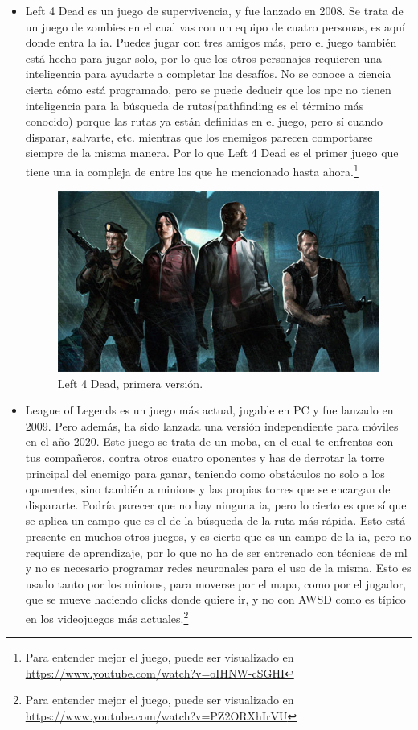 \begin{itemize}
	\item Left 4 Dead es un juego de supervivencia, y fue lanzado en 2008. Se trata de un juego de zombies en el cual vas con un equipo de cuatro personas, es aquí donde entra la \gls{ia}. Puedes jugar con tres amigos más, pero el juego también está hecho para jugar solo, por lo que los otros personajes requieren una inteligencia para ayudarte a completar los desafíos. No se conoce a ciencia cierta cómo está programado, pero se puede deducir que los \gls{npc} no tienen inteligencia para la búsqueda de rutas(pathfinding es el término más conocido) porque las rutas ya están definidas en el juego, pero sí cuando disparar, salvarte, etc.  mientras que los enemigos parecen comportarse siempre de la misma manera. Por lo que Left 4 Dead es el primer juego que tiene una \gls{ia} compleja de entre los que he mencionado hasta ahora.\footnote{Para entender mejor el juego, puede ser visualizado en \url{https://www.youtube.com/watch?v=oIHNW-cSGHI}}
	\begin{figure}[h]
		\centering
		\includegraphics[width=15cm]{archivos/imagenes/Left-4-Dead.jpg}
		\caption{Left 4 Dead, primera versión.}
	\end{figure}
	\item League of Legends es un juego más actual, jugable en PC y fue lanzado en 2009. Pero además, ha sido lanzada una versión independiente para móviles en el año 2020. Este juego se trata de un \gls{moba}, en el cual te enfrentas con tus compañeros, contra otros cuatro oponentes y has de derrotar la torre principal del enemigo para ganar, teniendo como obstáculos no solo a los oponentes, sino también a minions y las propias torres que se encargan de dispararte. Podría parecer que no hay ninguna \gls{ia}, pero lo cierto es que sí que se aplica un campo que es el de la búsqueda de la ruta más rápida. Esto está presente en muchos otros juegos, y es cierto que es un campo de la \gls{ia}, pero no requiere de aprendizaje, por lo que no ha de ser entrenado con técnicas de \gls{ml} y no es necesario programar redes neuronales para el uso de la misma. Esto es usado tanto por los minions, para moverse por el mapa, como por el jugador, que se mueve haciendo clicks donde quiere ir, y no con AWSD como es típico en los videojuegos más actuales.\footnote{Para entender mejor el juego, puede ser visualizado en \url{https://www.youtube.com/watch?v=PZ2ORXhIrVU}}

\end{itemize}
